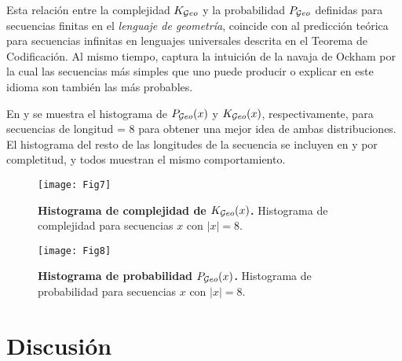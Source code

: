 Esta relación entre la complejidad $K_{\mathcal Geo}$ y la probabilidad $P_{\mathcal Geo}$ definidas para secuencias finitas en el \textit{lenguaje de geometría}, coincide con al predicción teórica para secuencias infinitas en lenguajes universales descrita en el Teorema de Codificación. Al mismo tiempo, captura la intuición de la navaja de Ockham por la cual las secuencias más simples que uno puede producir o explicar en este idioma son también las más probables.


En  y  se muestra el histograma de $P_{\mathcal Geo}(x)$ y $K_{\mathcal Geo}(x)$, respectivamente, para secuencias de longitud = 8 para obtener una mejor idea de ambas distribuciones. El histograma del resto de las longitudes de la secuencia se incluyen en  y  por completitud, y todos muestran el mismo comportamiento.

\begin{figure}[!ht]
    \centering
    \texttt{[image: Fig7]}
    \caption{{\bf Histograma de complejidad de $K_{\mathcal Geo}(x)$.} Histograma de complejidad para secuencias $x$ con $|x| = 8$.}
    \label{fig:codK:8}
\end{figure}


\begin{figure}[!ht]
    \centering
    \texttt{[image: Fig8]}
    \caption{{\bf Histograma de probabilidad $P_{\mathcal Geo}(x)$.} Histograma de probabilidad para secuencias $x$ con $|x| = 8$.}
    \label{fig:codP:8}
\end{figure}

\section{Discusión}

